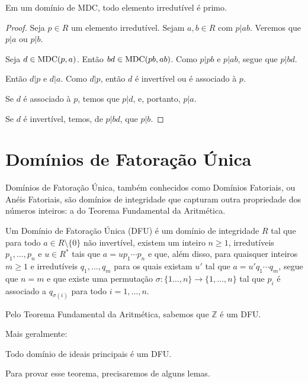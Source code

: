\begin{lemma}
    Em um domínio de MDC, todo elemento irredutível é primo.
    \end{lemma}
    
\begin{proof}
    Seja $p \in R$ um elemento irredutível.
    Sejam $a, b \in R$ com $p|ab$.
    Veremos que $p|a$ ou $p|b$.

    Seja $d\in\operatorname{MDC}(p, a)$.
    Então $bd\in \operatorname{MDC}(pb, ab)$.
    Como $p|pb$ e $p|ab$, segue que $p|bd$.

    Então $d|p$ e $d|a$.
    Como $d|p$, então $d$ é invertível ou é associado à $p$.

    Se $d$ é associado à $p$, temos que $p|d$, e, portanto, $p|a$.

    Se $d$ é invertível, temos, de $p|bd$, que $p|b$.
\end{proof}

\section{Domínios de Fatoração Única}
Domínios de Fatoração Única, também conhecidos como Domínios Fatoriais, ou Anéis Fatoriais, são domínios de integridade que capturam outra propriedade dos números inteiros:
a do Teorema Fundamental da Aritmética.

\begin{definition}
    Um Domínio de Fatoração Única (DFU) é um domínio de integridade $R$ tal que para todo $a\in R\setminus \{0\}$ não invertível, existem um inteiro $n\geq 1$, irredutíveis $p_1, \dots, p_n$ e $u\in R^*$ tais que $a=up_1\cdots p_n$ e que, além disso, para quaisquer inteiros $m\geq 1$ e irredutíveis $q_1, \dots, q_m$ para os quais existam $u'$ tal que $a=u'q_1\cdots q_m$, segue que $n=m$ e que existe uma permutação $\sigma:\{1\dots, n\}\rightarrow \{1, \dots, n\}$ tal que $p_i$ é associado a $q_{\sigma(i)}$ para todo $i=1, \dots, n$.

\end{definition}

Pelo Teorema Fundamental da Aritmética, sabemos que $\mathbb Z$ é um DFU.

Mais geralmente:

\begin{theorem}
    Todo domínio de ideais principais é um DFU.
\end{theorem}

Para provar esse teorema, precisaremos de alguns lemas.


